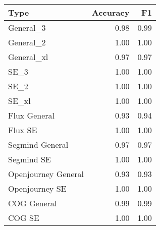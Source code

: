 \begin{tabular}{lrr}
\toprule
Type & Accuracy & F1 \\
\midrule
General_3 & 0.98 & 0.99 \\
General_2 & 1.00 & 1.00 \\
General_xl & 0.97 & 0.97 \\
SE_3 & 1.00 & 1.00 \\
SE_2 & 1.00 & 1.00 \\
SE_xl & 1.00 & 1.00 \\
Flux General & 0.93 & 0.94 \\
Flux SE & 1.00 & 1.00 \\
Segmind General & 0.97 & 0.97 \\
Segmind SE & 1.00 & 1.00 \\
Openjourney General & 0.93 & 0.93 \\
Openjourney SE & 1.00 & 1.00 \\
COG General & 0.99 & 0.99 \\
COG SE & 1.00 & 1.00 \\
\bottomrule
\end{tabular}
